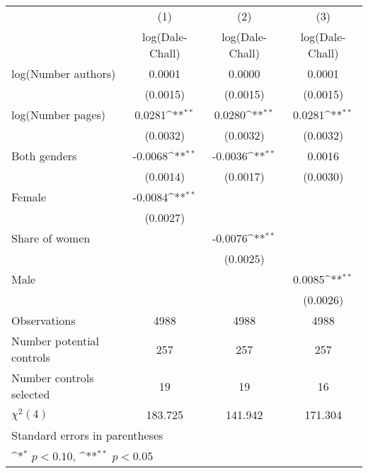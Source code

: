 {
\def\sym#1{\ifmmode^{#1}\else\(^{#1}\)\fi}
\begin{tabular}{l*{3}{c}}
\hline\hline
                    &\multicolumn{1}{c}{(1)}&\multicolumn{1}{c}{(2)}&\multicolumn{1}{c}{(3)}\\
                    &\multicolumn{1}{c}{log(Dale-Chall)}&\multicolumn{1}{c}{log(Dale-Chall)}&\multicolumn{1}{c}{log(Dale-Chall)}\\
\hline
\hspace{3mm}log(Number authors)&      0.0001        &      0.0000        &      0.0001        \\
                    &    (0.0015)        &    (0.0015)        &    (0.0015)        \\
[1em]
\hspace{3mm}log(Number pages)&      0.0281\sym{**}&      0.0280\sym{**}&      0.0281\sym{**}\\
                    &    (0.0032)        &    (0.0032)        &    (0.0032)        \\
[1em]
\hspace{3mm}Both genders&     -0.0068\sym{**}&     -0.0036\sym{**}&      0.0016        \\
                    &    (0.0014)        &    (0.0017)        &    (0.0030)        \\
[1em]
\hspace{3mm}Female  &     -0.0084\sym{**}&                    &                    \\
                    &    (0.0027)        &                    &                    \\
[1em]
\hspace{3mm}Share of women&                    &     -0.0076\sym{**}&                    \\
                    &                    &    (0.0025)        &                    \\
[1em]
\hspace{3mm}Male    &                    &                    &      0.0085\sym{**}\\
                    &                    &                    &    (0.0026)        \\
\hline
Observations        &        4988        &        4988        &        4988        \\
Number potential controls&         257        &         257        &         257        \\
Number controls selected&          19        &          19        &          16        \\
$\chi^2(4)$         &     183.725        &     141.942        &     171.304        \\
\hline\hline
\multicolumn{4}{l}{\footnotesize Standard errors in parentheses}\\
\multicolumn{4}{l}{\footnotesize \sym{*} \(p<0.10\), \sym{**} \(p<0.05\)}\\
\end{tabular}
}
